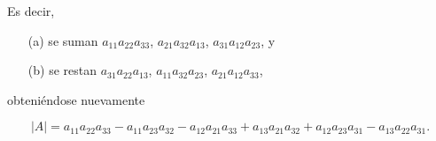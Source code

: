\documentclass[handout]{beamer} %
\begin{document}
\begin{frame}
    Es decir,
        \begin{enumerate}
            \item[(a)]  se suman  $a_{11}a_{22}a_{33}$, $a_{21}a_{32}a_{13}$, $a_{31}a_{12}a_{23}$,  y
            \item[(b)]  se restan  $a_{31}a_{22}a_{13}$,  $a_{11}a_{32}a_{23}$,  $a_{21}a_{12}a_{33}$, 
        \end{enumerate}
        \pause
        obteniéndose nuevamente 

        \begin{equation*}
            |A| =a_{11}a_{22}a_{33}- a_{11}a_{23}a_{32} 
            - a_{12}a_{21}a_{33}+ a_{13}a_{21}a_{32}+ a_{12}a_{23}a_{31}
            - a_{13}a_{22}a_{31}.
            \end{equation*} 

        \vskip 2cm

        
\end{frame}
\end{document}
